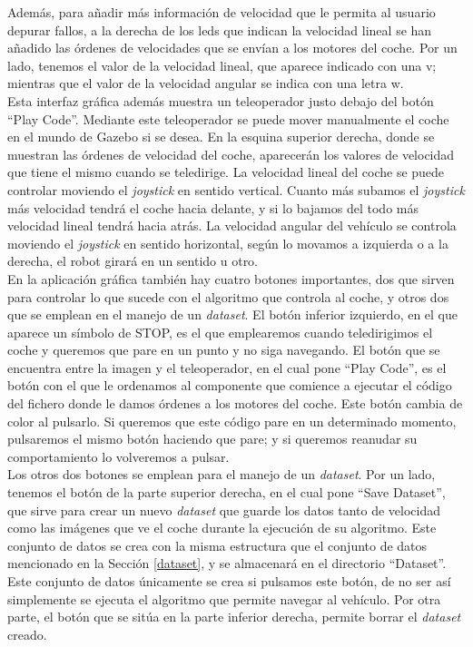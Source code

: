 Además, para añadir más información de velocidad que le permita al usuario depurar fallos, a la derecha de los leds que indican la velocidad lineal se han añadido las órdenes de velocidades que se envían a los motores del coche. Por un lado, tenemos el valor de la velocidad lineal, que aparece indicado con una v; mientras que el valor de la velocidad angular se indica con una letra w.\\

Esta interfaz gráfica además muestra un teleoperador justo debajo del botón ``Play Code''. Mediante este teleoperador se puede mover manualmente el coche en el mundo de Gazebo si se desea. En la esquina superior derecha, donde se muestran las órdenes de velocidad del coche, aparecerán los valores de velocidad que tiene el mismo cuando se teledirige. La velocidad lineal del coche se puede controlar moviendo el \textit{joystick} en sentido vertical. Cuanto más subamos el \textit{joystick} más velocidad tendrá el coche hacia delante, y si lo bajamos del todo más velocidad lineal tendrá hacia atrás. La velocidad angular del vehículo se controla moviendo el \textit{joystick} en sentido horizontal, según lo movamos a izquierda o a la derecha, el robot girará en un sentido u otro.\\

En la aplicación gráfica también hay cuatro botones importantes, dos que sirven para controlar lo que  sucede con el algoritmo que controla al coche, y otros dos que se emplean en el manejo de un \textit{dataset}. El botón inferior  izquierdo, en el que aparece un símbolo de STOP, es el que emplearemos cuando teledirigimos el coche y queremos que pare en un punto y no siga navegando. El botón que se encuentra entre la imagen y el teleoperador, en el cual pone ``Play Code'', es el botón con el que le ordenamos al componente que comience a ejecutar el código del fichero donde le damos órdenes a los motores del coche. Este botón cambia de color al pulsarlo. Si queremos que este código pare en un determinado momento, pulsaremos el mismo botón haciendo que pare; y si queremos reanudar su comportamiento lo volveremos a pulsar.\\

Los otros dos botones se emplean para el manejo de un \textit{dataset}. Por un lado, tenemos el botón de la parte superior derecha, en el cual pone ``Save Dataset'', que sirve para crear un nuevo \textit{dataset} que guarde los datos tanto de velocidad como las imágenes que ve el coche durante la ejecución de su algoritmo. Este conjunto de datos se crea con la misma estructura que el conjunto de datos mencionado en la Sección \ref{dataset}, y se almacenará en el directorio ``Dataset''. Este conjunto de datos únicamente se crea si pulsamos este botón, de no ser así simplemente se ejecuta el algoritmo que permite navegar al vehículo. Por otra parte, el botón que se sitúa en la parte inferior derecha, permite borrar el \textit{dataset} creado.\\



